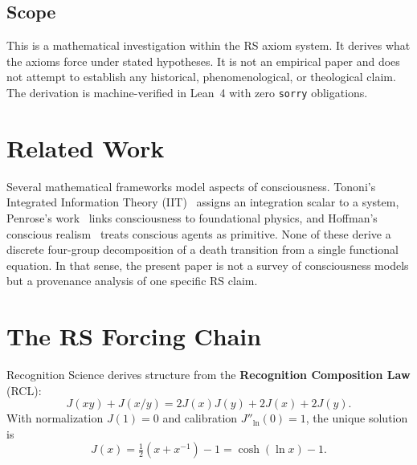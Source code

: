 \documentclass[11pt,a4paper]{article}
\theoremstyle{definition}
\newcommand{\Jcost}{J}
\begin{document}
\subsection{Scope}

This is a mathematical investigation within the RS axiom system.
It derives what the axioms force under stated hypotheses. It is not an
empirical paper and does not attempt to establish any historical,
phenomenological, or theological claim. The derivation is
machine-verified in Lean~4 with zero \texttt{sorry} obligations.

\section{Related Work}
\label{sec:related}

Several mathematical frameworks model aspects of consciousness.
Tononi's Integrated Information Theory
(IIT)~\cite{Tononi2004,Oizumi2014} assigns an integration scalar to a
system, Penrose's work~\cite{Penrose1994} links consciousness to
foundational physics, and Hoffman's conscious realism~\cite{Hoffman2019}
treats conscious agents as primitive. None of these derive a discrete
four-group decomposition of a death transition from a single
functional equation. In that sense, the present paper is not a survey
of consciousness models but a provenance analysis of one specific RS
claim.

\section{The RS Forcing Chain}
\label{sec:forcing}

Recognition Science derives structure from the
\textbf{Recognition Composition Law} (RCL):
\begin{equation}
\label{eq:RCL}
\Jcost(xy) + \Jcost(x/y)
= 2\Jcost(x)\Jcost(y) + 2\Jcost(x) + 2\Jcost(y).
\end{equation}
With normalization $\Jcost(1)=0$ and calibration
$\Jcost''_{\ln}(0)=1$, the unique solution is~\cite{Washburn2026axioms}
\begin{equation}
\label{eq:Jcost}
\Jcost(x) = \tfrac{1}{2}(x + x^{-1}) - 1 = \cosh(\ln x) - 1.
\end{equation}
\end{document}
